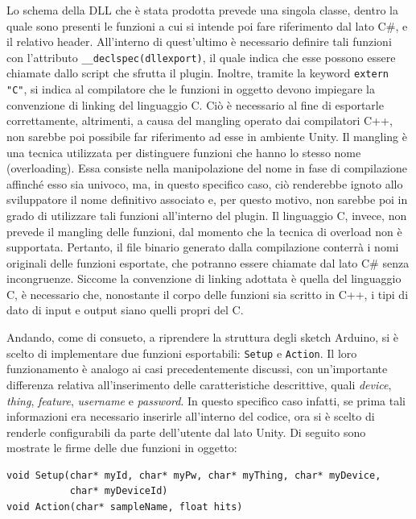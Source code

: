 Lo schema della DLL che è stata prodotta prevede una singola classe, dentro la quale sono presenti le funzioni a cui si intende poi fare riferimento dal lato C\#, e il relativo header. All'interno di quest'ultimo è necessario definire tali funzioni con l’attributo \texttt{\_\_declspec(dllexport)}, il quale indica che esse possono essere chiamate dallo script che sfrutta il plugin. Inoltre, tramite la keyword \texttt{extern "C"}, si indica al compilatore che le funzioni in oggetto devono impiegare la convenzione di linking del linguaggio C. Ciò è necessario al fine di esportarle correttamente, altrimenti, a causa del mangling operato dai compilatori C++, non sarebbe poi possibile far riferimento ad esse in ambiente Unity. Il mangling è una tecnica utilizzata per distinguere funzioni che hanno lo stesso nome (overloading). Essa consiste nella manipolazione del nome in fase di compilazione affinché esso sia univoco, ma, in questo specifico caso, ciò renderebbe ignoto allo sviluppatore il nome definitivo associato e, per questo motivo, non sarebbe poi in grado di utilizzare tali funzioni all'interno del plugin. Il linguaggio C, invece, non prevede il mangling delle funzioni, dal momento che la tecnica di overload non è supportata. Pertanto, il file binario generato dalla compilazione conterrà i nomi originali delle funzioni esportate, che potranno essere chiamate dal lato C\# senza incongruenze. Siccome la convenzione di linking adottata è quella del linguaggio C, è necessario che, nonostante il corpo delle funzioni sia scritto in C++, i tipi di dato di input e output siano quelli propri del C.

Andando, come di consueto, a riprendere la struttura degli sketch Arduino, si è scelto di implementare due funzioni esportabili: \texttt{Setup} e \texttt{Action}. Il loro funzionamento è analogo ai casi precedentemente discussi, con un’importante differenza relativa all'inserimento delle caratteristiche descrittive, quali \textit{device}, \textit{thing}, \textit{feature}, \textit{username} e \textit{password}. In questo specifico caso infatti, se prima tali informazioni era necessario inserirle all'interno del codice, ora si è scelto di renderle configurabili da parte dell'utente dal lato Unity. Di seguito sono mostrate le firme delle due funzioni in oggetto:

\begin{verbatim}
void Setup(char* myId, char* myPw, char* myThing, char* myDevice,
           char* myDeviceId)
void Action(char* sampleName, float hits)
\end{verbatim}

